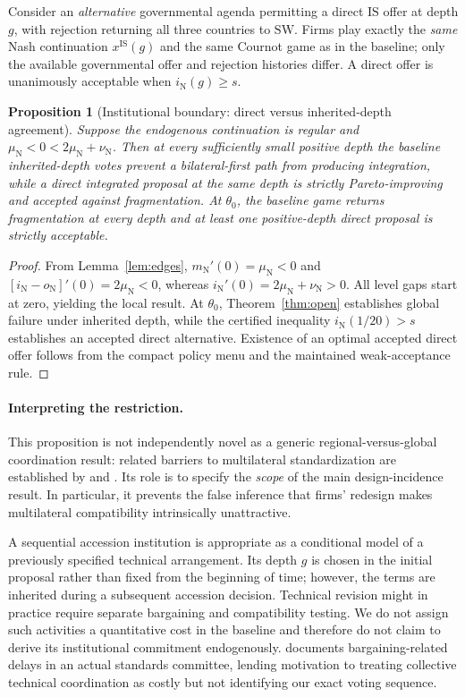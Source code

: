 \documentclass[11pt,a4paper]{article}
\newtheorem{proposition}[theorem]{Proposition}
\theoremstyle{remark}\newtheorem{remark}[theorem]{Remark}
\newcommand{\SW}{\mathrm{SW}}\newcommand{\SU}{\mathrm{SU}}\newcommand{\IS}{\mathrm{IS}}
\newcommand{\N}{\mathrm{N}}\newcommand{\F}{\mathrm{F}}
\begin{document}
Consider an \emph{alternative} governmental agenda permitting a direct $\IS$ offer at depth $g$, with rejection returning all three countries to $\SW$. Firms play exactly the \emph{same} Nash continuation $x^{\IS}(g)$ and the same Cournot game as in the baseline; only the available governmental offer and rejection histories differ. A direct offer is unanimously acceptable when $i_{\N}(g)\ge s$.

\begin{proposition}[Institutional boundary: direct versus inherited-depth agreement]\label{prop:direct}
Suppose the endogenous continuation is regular and $\mu_{\N}<0<2\mu_{\N}+\nu_{\N}$. Then at every sufficiently small positive depth the baseline inherited-depth votes prevent a bilateral-first path from producing integration, while a \emph{direct} integrated proposal at the same depth is strictly Pareto-improving and accepted against fragmentation. At $\theta_0$, the baseline game returns fragmentation at every depth and at least one positive-depth direct proposal is strictly acceptable.
\end{proposition}
\begin{proof}
From Lemma~\ref{lem:edges}, $m_{\N}'(0)=\mu_{\N}<0$ and $[i_{\N}-o_{\N}]'(0)=2\mu_{\N}<0$, whereas $i_{\N}'(0)=2\mu_{\N}+\nu_{\N}>0$. All level gaps start at zero, yielding the local result. At $\theta_0$, Theorem~\ref{thm:open} establishes global failure under inherited depth, while the certified inequality $i_{\N}(1/20)>s$ establishes an accepted direct alternative. Existence of an optimal accepted direct offer follows from the compact policy menu and the maintained weak-acceptance rule.
\end{proof}

\paragraph{Interpreting the restriction.}
This proposition is not independently novel as a generic regional-versus-global coordination result: related barriers to multilateral standardization are established by \citet{Takarada2020} and \citet{Kawabata2021}. Its role is to specify the \emph{scope} of the main design-incidence result. In particular, it prevents the false inference that firms' redesign makes multilateral compatibility intrinsically unattractive.

A sequential accession institution is appropriate as a conditional model of a previously specified technical arrangement. Its depth $g$ is chosen in the initial proposal rather than fixed from the beginning of time; however, the terms are inherited during a subsequent accession decision. Technical revision might in practice require separate bargaining and compatibility testing. We do not assign such activities a quantitative cost in the baseline and therefore do not claim to derive its institutional commitment endogenously. \citet{Simcoe2012} documents bargaining-related delays in an actual standards committee, lending motivation to treating collective technical coordination as costly but not identifying our exact voting sequence.
\end{document}
